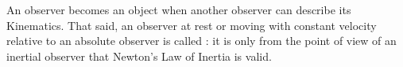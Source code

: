 An observer becomes an object when another observer can describe its Kinematics. That said, an observer at rest or moving with constant velocity relative to an absolute observer is called : it is only from the point of view of an inertial observer that Newton's Law of Inertia is valid.  








